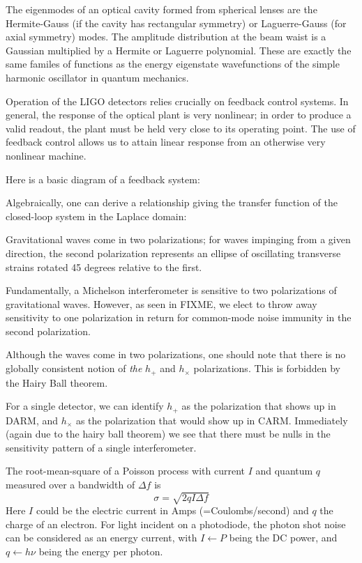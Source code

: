 
The eigenmodes of an optical cavity formed from spherical lenses are
the Hermite-Gauss (if the cavity has rectangular symmetry) or
Laguerre-Gauss (for axial symmetry) modes.  The amplitude distribution
at the beam waist is a Gaussian multiplied by a Hermite or Laguerre
polynomial.  These are exactly the same familes of functions as the
energy eigenstate wavefunctions of the simple harmonic oscillator in
quantum mechanics.


Operation of the LIGO detectors relies crucially on feedback control
systems.  In general, the response of the optical plant is very
nonlinear; in order to produce a valid readout, the plant must be held
very close to its operating point.  The use of feedback control allows
us to attain linear response from an otherwise very nonlinear machine.

Here is a basic diagram of a feedback system:

Algebraically, one can derive a relationship giving the transfer function
of the closed-loop system in the Laplace domain:


Gravitational waves come in two polarizations; for waves impinging
from a given direction, the second polarization represents an ellipse
of oscillating transverse strains rotated 45 degrees relative to the
first.  

Fundamentally, a Michelson interferometer is sensitive to two
polarizations of gravitational waves.  However, as seen in FIXME, we
elect to throw away sensitivity to one polarization in return for
common-mode noise immunity in the second polarization.

Although the waves come in two polarizations, one should note that
there is no globally consistent notion of \emph{the} $h_+$ and
$h_\times$ polarizations.  This is forbidden by the Hairy Ball
theorem.  

For a single detector, we can identify $h_+$ as the polarization
that shows up in DARM, and $h_\times$ as the polarization that would
show up in CARM.  Immediately (again due to the hairy ball theorem) we
see that there must be nulls in the sensitivity pattern of a single
interferometer.

The root-mean-square of a Poisson process with current $I$ and quantum
$q$ measured over a bandwidth of $\Delta f$ is 
$$\sigma = \sqrt{2 q I \Delta f}$$ 
Here $I$ could be the electric current in Amps (=Coulombs/second) and
$q$ the charge of an electron.  For light incident on a photodiode,
the photon shot noise can be considered as an energy current, with
$I\leftarrow P$ being the DC power, and $q\leftarrow h\nu$ being the
energy per photon.

